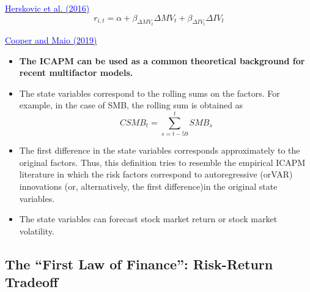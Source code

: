 \documentclass{beamer}
\begin{document}
\begin{frame}{\href{https://doi.org/10.1016/j.jfineco.2015.09.010}{\textcolor{blue}{Herskovic et al. (2016)}}}
	\begin{equation}
		r_{i,t} = \alpha + \beta_{\Delta MV_t}  \Delta MV_t + \beta_{\Delta IV_t}  \Delta IV_t
	\end{equation}
\end{frame}

\begin{frame}{\href{https://doi.org/10.1287/mnsc.2018.3036}{\textcolor{blue}{Cooper and Maio (2019)}}}
	\begin{itemize}
		\item \textbf{The ICAPM can be used as a common theoretical background for recent multifactor models.}
		\item The state variables correspond to the rolling sums on the factors. For example, in the case of SMB, the rolling sum is obtained as
		\begin{equation}
			C SMB_{t}=\sum_{s=t-59}^{t} SMB_{s}
		\end{equation}
	\item The first difference in the state variables corresponds
	approximately to the original factors. Thus, this definition tries to resemble the empirical ICAPM literature in
	which the risk factors correspond to autoregressive (orVAR) innovations (or, alternatively, the first difference)in the original state variables.
	\item The state variables can forecast stock market return or stock market volatility.
	\end{itemize}
\end{frame}



\subsection{The ``First Law of Finance'': Risk-Return Tradeoff}
\end{document}
